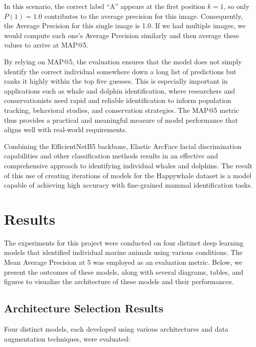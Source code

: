 \documentclass[twocolumn]{article}
\begin{document}
In this scenario, the correct label “A” appears at the first position \( k=1 \), so only \( P(1) = 1.0 \) contributes to the average precision for this image. Consequently, the Average Precision for this single image is 1.0. If we had multiple images, we would compute each one’s Average Precision similarly and then average these values to arrive at MAP@5.

By relying on MAP@5, the evaluation ensures that the model does not simply identify the correct individual somewhere down a long list of predictions but ranks it highly within the top five guesses. This is especially important in applications such as whale and dolphin identification, where researchers and conservationists need rapid and reliable identification to inform population tracking, behavioral studies, and conservation strategies. The MAP@5 metric thus provides a practical and meaningful measure of model performance that aligns well with real-world requirements.

Combining the EfficientNetB5 backbone, Elastic ArcFace facial discrimination capabilities and other classification methods results in an effective and comprehensive approach to identifying individual whales and dolphins. The result of this use of creating iterations of models for the Happywhale dataset is a model capable of achieving high accuracy with fine-grained mammal identification tasks.

\section{Results}

The experiments for this project were conducted on four distinct deep learning models that identified individual marine animals using various conditions. The Mean Average Precision at 5 was employed as an evaluation metric. Below, we present the outcomes of these models, along with several diagrams, tables, and figures to visualize the architecture of these models and their performances.

\subsection{Architecture Selection Results}



Four distinct models, each developed using various architectures and data augmentation techniques, were evaluated:
\end{document}
